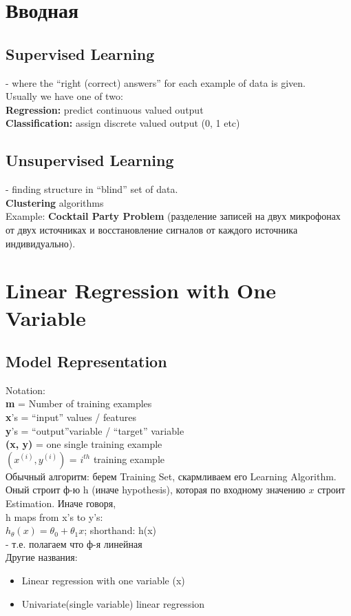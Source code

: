 \documentclass{scrartcl}
\begin{document}
\label{Chapter 1}
\section {Вводная}
\subsection* {Supervised Learning} - where the ``right (correct)
answers'' for
each example of data is given. \\
Usually we have one of two:\\
{\bf Regression:} predict continuous valued output \\
{\bf Classification:} assign discrete valued output (0, 1 etc) \\

\subsection* {Unsupervised Learning} - finding structure in ``blind''
set of data. \\
{\bf Clustering} algorithms  \\
Example: {\bf Cocktail Party Problem} (разделение записей на двух
микрофонах от двух источниках и восстановление сигналов от каждого
источника индивидуально). \\

\label{Chapter 2}
\section {Linear Regression with One Variable}

\subsection {Model Representation}
Notation: \\
{\bf m} =  Number of training examples \\
{\bf x}'s = ``input'' values / features \\
{\bf y}'s = ``output''variable / ``target'' variable \\
{\bf (x, y)} = one single training example \\
{\bf $(x^{(i)}, y^{(i)})$} = $i^{th}$ training example \\

Обычный алгоритм: берем Training Set, скармливаем его Learning
Algorithm. Оный строит ф-ю h (иначе hypothesis), которая по входному
значению $x$ строит Estimation. Иначе говоря, \\
h maps from x's to y's: \\
$h_\theta(x)=\theta_0 + \theta_1x$; shorthand: h(x) \\
- т.е. полагаем что ф-я линейная \\
Другие названия:
\begin{itemize}
\item Linear regression with one variable (x)
\item Univariate(single variable) linear regression
\end{itemize}
\end{document}
